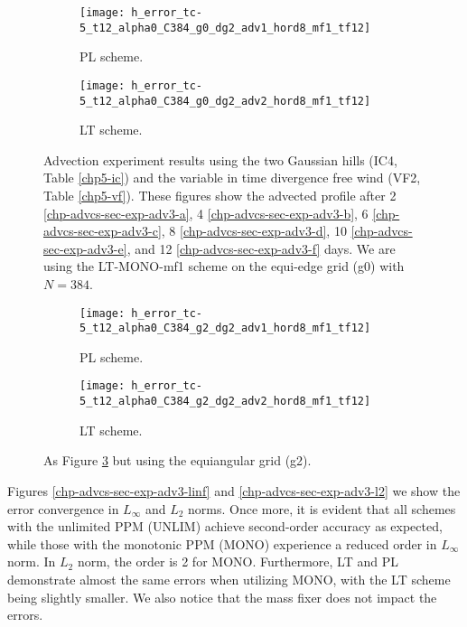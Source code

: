 \begin{figure}[!htb]
	\centering
	\begin{subfigure}{0.45\textwidth}
		\centering
		\texttt{[image: h\_error\_tc-5\_t12\_alpha0\_C384\_g0\_dg2\_adv1\_hord8\_mf1\_tf12]}
		\caption{PL scheme.\label{chp-advcs-sec-exp-adv3-errors-0a}}
	\end{subfigure}
	\begin{subfigure}{0.45\textwidth}
		\centering
		\texttt{[image: h\_error\_tc-5\_t12\_alpha0\_C384\_g0\_dg2\_adv2\_hord8\_mf1\_tf12]}
		\caption{LT scheme.\label{chp-advcs-sec-exp-adv3-errors-0b}}
	\end{subfigure}
	\caption{
Advection experiment results using the two Gaussian hills  (IC4, Table \ref{chp5-ic}) and 
the variable in time divergence free wind (VF2, Table \ref{chp5-vf}).
These figures show the advected profile after
2 \eqref{chp-advcs-sec-exp-adv3-a}, 
4  \eqref{chp-advcs-sec-exp-adv3-b},
6  \eqref{chp-advcs-sec-exp-adv3-c},
8  \eqref{chp-advcs-sec-exp-adv3-d},
10  \eqref{chp-advcs-sec-exp-adv3-e},
and 12  \eqref{chp-advcs-sec-exp-adv3-f} days.
We are using the LT-MONO-mf1 scheme on the equi-edge grid (g0) with $N=384$.
		 \label{chp-advcs-sec-exp-adv3-errors-0}}
\end{figure}
\begin{figure}[!htb]
	\centering
	\begin{subfigure}{0.45\textwidth}
		\centering
		\texttt{[image: h\_error\_tc-5\_t12\_alpha0\_C384\_g2\_dg2\_adv1\_hord8\_mf1\_tf12]}
		\caption{PL scheme.\label{chp-advcs-sec-exp-adv3-errors-2a}}
	\end{subfigure}
	\begin{subfigure}{0.45\textwidth}
		\centering
		\texttt{[image: h\_error\_tc-5\_t12\_alpha0\_C384\_g2\_dg2\_adv2\_hord8\_mf1\_tf12]}
		\caption{LT scheme.\label{chp-advcs-sec-exp-adv3-errors-2b}}
	\end{subfigure}
	\caption{As Figure \ref{chp-advcs-sec-exp-adv3-errors-0} but using the equiangular grid (g2).\label{chp-advcs-sec-exp-adv3-errors-2}}
\end{figure}
Figures \ref{chp-advcs-sec-exp-adv3-linf} and \ref{chp-advcs-sec-exp-adv3-l2} we show the error convergence in $L_{\infty}$ and $L_{2}$ norms.
Once more, it is evident that all schemes with the unlimited PPM (UNLIM) achieve second-order accuracy as expected, while those with the monotonic PPM (MONO) experience a reduced order 
in $L_{\infty}$ norm. In $L_{2}$ norm, the order is 2 for MONO.
Furthermore, LT and PL demonstrate almost the same errors when utilizing MONO, with the LT scheme being slightly smaller.
We also notice that the mass fixer does not impact the errors.

